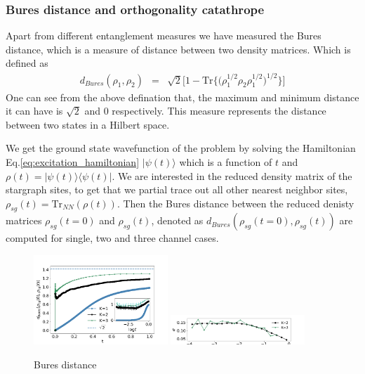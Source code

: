 \documentclass[reprint,prb,superscriptaddress]{revtex4-2}
\begin{document}
\subsubsection{Bures distance and orthogonality catathrope}
\noindent Apart from different entanglement measures we have measured the Bures distance, which is a measure of distance between two density matrices. Which is defined as 
\begin{eqnarray}
d_{Bures}(\rho_1,\rho_2) &=& \sqrt{2} \bigg[1- \textrm{Tr}\bigg\{ \bigg(\rho_1^{1/2}  \rho_2 \rho_{1}^{1/2}\bigg)^{1/2} \bigg\}\bigg]
\end{eqnarray}
One can see from the above defination that, the maximum and minimum distance it can have is $\sqrt{2}$ and $0$ respectively. This measure represents the distance between two states in a Hilbert space. 
\par We get the ground state wavefunction of the problem by solving the Hamiltonian Eq.\eqref{eq:excitation_hamiltonian} $|\psi(t)\rangle$ which is a function of $t$ and $\rho(t)= |\psi(t)\rangle \langle \psi(t)|$. We are interested in the reduced density matrix of the stargraph sites, to get that we partial trace out all other nearest neighbor sites, $\rho_{sg}(t)=\textrm{Tr}_{NN}(\rho(t))$. Then the Bures distance between the reduced denisty matrices $\rho_{sg}(t=0)$ and $\rho_{sg}(t)$, denoted as $d_{Bures}(\rho_{sg}(t=0),\rho_{sg}(t))$ are computed for single, two and three channel cases.
\begin{figure}[!htpb]
\includegraphics[width=0.45\textwidth]{plt/error_Bures_Distance_Ch123_10001}
\includegraphics[width=0.45\textwidth]{plt/errorbar_Bures_Distance_Ch123_10001}
\caption{Bures distance}
\label{fig:bures_distance}
\end{figure}
\end{document}
